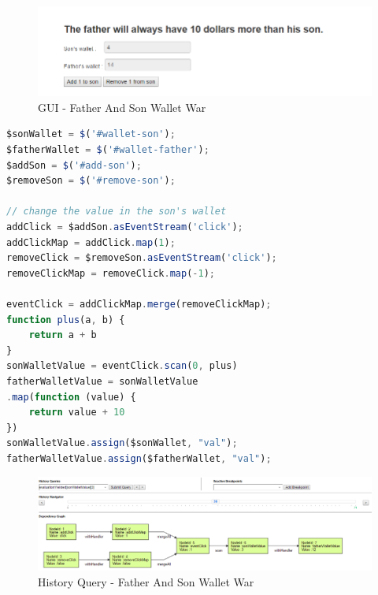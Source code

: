 \begin{figure}[!h]
	\centering
	\includegraphics[width=\textwidth,height=\textheight,keepaspectratio]{gfx/evaluation/son_father_wallet_ui.png}
	\caption{GUI - Father And Son Wallet War}
	\label{fig:son_father_wallet_ui}
\end{figure}

\begin{lstlisting}[language=JavaScript, caption=Bacon.js - Father And Son Wallet War, label={lst:evaluation-bacon-son-father-wallet}]
$sonWallet = $('#wallet-son');
$fatherWallet = $('#wallet-father');
$addSon = $('#add-son');
$removeSon = $('#remove-son');

// change the value in the son's wallet
addClick = $addSon.asEventStream('click');
addClickMap = addClick.map(1);
removeClick = $removeSon.asEventStream('click');
removeClickMap = removeClick.map(-1);

eventClick = addClickMap.merge(removeClickMap);
function plus(a, b) {
	return a + b
}
sonWalletValue = eventClick.scan(0, plus)
fatherWalletValue = sonWalletValue
.map(function (value) {
	return value + 10
})
sonWalletValue.assign($sonWallet, "val");
fatherWalletValue.assign($fatherWallet, "val");
\end{lstlisting}

\begin{figure}[!h]
	\centering
	\includegraphics[width=\textwidth,height=\textheight,keepaspectratio]{gfx/evaluation/bacon-dg_son_father_wallet_search.png}
	\caption{History Query - Father And Son Wallet War}
	\label{fig:bacon_son_father_wallet_war}
\end{figure}



